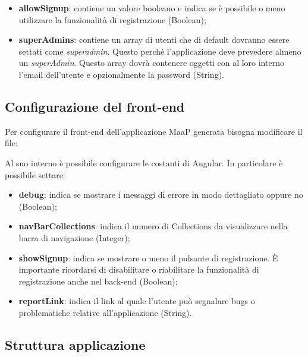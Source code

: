 \begin{itemize}
\item \textbf{allowSignup}: contiene un valore booleano e indica se è possibile o meno utilizzare la funzionalità di registrazione (Boolean);

\item \textbf{superAdmins}: contiene un array di utenti che di default dovranno essere settati come \textit{superadmin}. Questo perché l'applicazione deve prevedere almeno un \textit{superAdmin}. Questo array dovrà contenere oggetti con al loro interno l'email dell'utente e opzionalmente la password (String).

\end{itemize}

\subsection{Configurazione del front-end}

Per configurare il front-end dell'applicazione MaaP generata bisogna modificare il file:


Al suo interno è possibile configurare le costanti di Angular. In particolare è possibile settare:

\begin{itemize}

	\item \textbf{debug}: indica se mostrare i messaggi di errore in modo dettagliato oppure no (Boolean);

	\item \textbf{navBarCollections}: indica il numero di Collections da visualizzare nella barra di navigazione (Integer);

	\item \textbf{showSignup}: indica se mostrare o meno il pulsante di registrazione. È importante ricordarsi di disabilitare o riabilitare la funzionalità di registrazione anche nel back-end (Boolean);

	\item \textbf{reportLink}: indica il link al quale l'utente può segnalare bugs o problematiche relative all'applicazione (String).

\end{itemize}


\subsection{Struttura applicazione}

